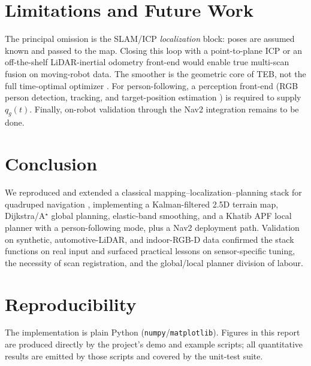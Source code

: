 \documentclass[11pt]{article}
\begin{document}
\section{Limitations and Future Work}
\label{sec:limits}
The principal omission is the SLAM/ICP \emph{localization} block: poses are assumed
known and passed to the map. Closing this loop with a point-to-plane ICP
\cite{besl1992} or an off-the-shelf LiDAR-inertial odometry front-end would enable
true multi-scan fusion on moving-robot data. The smoother is the geometric core of
TEB, not the full time-optimal optimizer \cite{rosmann2017}. For person-following,
a perception front-end (RGB person detection, tracking, and target-position
estimation \cite{islam2019}) is required to supply $q_g(t)$. Finally, on-robot
validation through the Nav2 integration \cite{macenski2020} remains to be done.

\section{Conclusion}
\label{sec:conclusion}
We reproduced and extended a classical mapping--localization--planning stack for
quadruped navigation \cite{refpaper}, implementing a Kalman-filtered 2.5D terrain
map, Dijkstra/A$^\star$ global planning, elastic-band smoothing, and a Khatib APF
local planner with a person-following mode, plus a Nav2 deployment path. Validation
on synthetic, automotive-LiDAR, and indoor-RGB-D data confirmed the stack functions
on real input and surfaced practical lessons on sensor-specific tuning, the
necessity of scan registration, and the global/local planner division of labour.

\section*{Reproducibility}
The implementation is plain Python (\texttt{numpy}/\texttt{matplotlib}). Figures in
this report are produced directly by the project's demo and example scripts; all
quantitative results are emitted by those scripts and covered by the unit-test
suite.



\end{document}
